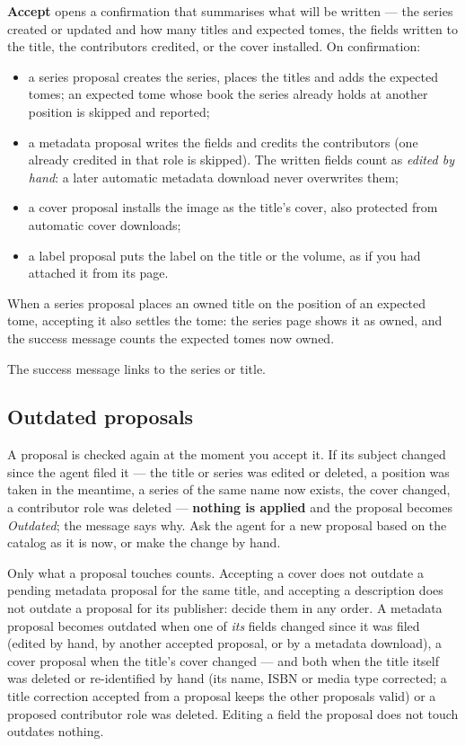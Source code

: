 \textbf{Accept} opens a confirmation that summarises what will be
written --- the series created or updated and how many titles and
expected tomes, the fields written to the title, the contributors
credited, or the cover installed. On confirmation:

\begin{itemize}
  \item a series proposal creates the series, places the titles and
        adds the expected tomes; an expected tome whose book the
        series already holds at another position is skipped and
        reported;
  \item a metadata proposal writes the fields and credits the
        contributors (one already credited in that role is skipped).
        The written fields count as \emph{edited by hand}: a later
        automatic metadata download never overwrites them;
  \item a cover proposal installs the image as the title's cover,
        also protected from automatic cover downloads;
  \item a label proposal puts the label on the title or the volume, as
        if you had attached it from its page.
\end{itemize}

When a series proposal places an owned title on the position of an
expected tome, accepting it also settles the tome: the series page
shows it as owned, and the success message counts the expected tomes
now owned.

The success message links to the series or title.

\subsection{Outdated proposals}

A proposal is checked again at the moment you accept it. If its
subject changed since the agent filed it --- the title or series was
edited or deleted, a position was taken in the meantime, a series of
the same name now exists, the cover changed, a contributor role was
deleted --- \textbf{nothing is
applied} and the proposal becomes \emph{Outdated}; the message says
why. Ask the agent for a new proposal based on the catalog as it is
now, or make the change by hand.

Only what a proposal touches counts. Accepting a cover does not
outdate a pending metadata proposal for the same title, and accepting
a description does not outdate a proposal for its publisher: decide
them in any order. A metadata proposal becomes outdated when one of
\emph{its} fields changed since it was filed (edited by hand, by
another accepted proposal, or by a metadata download), a cover
proposal when the title's cover changed --- and both when the title
itself was deleted or re-identified by hand (its name, ISBN or media
type corrected; a title correction accepted from a proposal keeps the
other proposals valid) or a proposed contributor role was deleted. Editing a field
the proposal does not touch outdates nothing.

